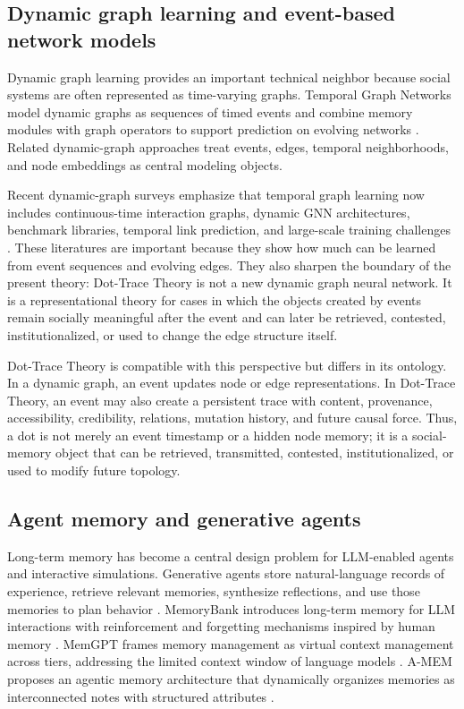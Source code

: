 \documentclass[11pt]{article}
\theoremstyle{remark}
\begin{document}
\subsection{Dynamic graph learning and event-based network models}\label{dynamic-graph-learning-event-based-models}

Dynamic graph learning provides an important technical neighbor because social systems are often represented as time-varying graphs. Temporal Graph Networks model dynamic graphs as sequences of timed events and combine memory modules with graph operators to support prediction on evolving networks \citep{rossi2020temporal}. Related dynamic-graph approaches treat events, edges, temporal neighborhoods, and node embeddings as central modeling objects.

Recent dynamic-graph surveys emphasize that temporal graph learning now includes continuous-time interaction graphs, dynamic GNN architectures, benchmark libraries, temporal link prediction, and large-scale training challenges \citep{zheng2024dynamicgnn,jiao2025temporalinteraction,yu2023dygformer,feng2024dynamicgnn}. These literatures are important because they show how much can be learned from event sequences and evolving edges. They also sharpen the boundary of the present theory: Dot-Trace Theory is not a new dynamic graph neural network. It is a representational theory for cases in which the objects created by events remain socially meaningful after the event and can later be retrieved, contested, institutionalized, or used to change the edge structure itself.


Dot-Trace Theory is compatible with this perspective but differs in its ontology. In a dynamic graph, an event updates node or edge representations. In Dot-Trace Theory, an event may also create a persistent trace with content, provenance, accessibility, credibility, relations, mutation history, and future causal force. Thus, a dot is not merely an event timestamp or a hidden node memory; it is a social-memory object that can be retrieved, transmitted, contested, institutionalized, or used to modify future topology.

\subsection{Agent memory and generative agents}\label{agent-memory-generative-agents-graph-memory}

Long-term memory has become a central design problem for LLM-enabled agents and interactive simulations. Generative agents store natural-language records of experience, retrieve relevant memories, synthesize reflections, and use those memories to plan behavior \citep{park2023generative}. MemoryBank introduces long-term memory for LLM interactions with reinforcement and forgetting mechanisms inspired by human memory \citep{zhong2024memorybank}. MemGPT frames memory management as virtual context management across tiers, addressing the limited context window of language models \citep{packer2023memgpt}. A-MEM proposes an agentic memory architecture that dynamically organizes memories as interconnected notes with structured attributes \citep{xu2025amem}.
\end{document}
